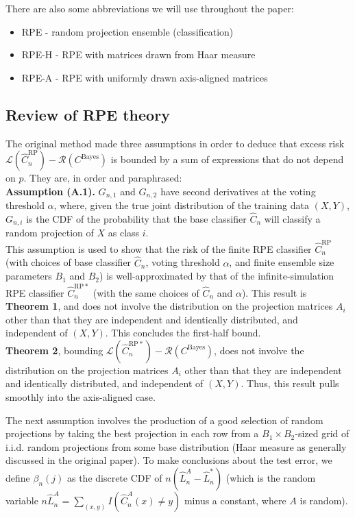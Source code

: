 \documentclass[ejs,preprint]{imsart}
\newcommand\cbayes{C^{\mathrm{Bayes}}}
\newcommand\crpnhat{\hat{C}_{n}^{\mathrm{RP}}}
\newcommand\crpnhatstar{\hat{C}_{n}^{\mathrm{RP*}}}
\newcommand\risk{\mathcal{L}}
\newcommand\rrisk{\mathcal{R}}
\begin{document}
There are also some abbreviations we will use throughout the paper:
\begin{itemize}
\item RPE - random projection ensemble (classification)
\item RPE-H - RPE with matrices drawn from Haar measure
\item RPE-A - RPE with uniformly drawn axis-aligned matrices
\end{itemize}

\subsection{Review of RPE theory}\label{sec:review}

The original method made three assumptions in order to deduce that
excess risk $\risk(\crpnhat)-\rrisk(\cbayes)$ is bounded by a sum
of expressions that do not depend on $p$. They are, in order and
paraphrased:\\


\noindent \textbf{Assumption (A.1).} $G_{n,1}$ and $G_{n,2}$ have
second derivatives at the voting threshold $\alpha$, where, given
the true joint distribution of the training data $(X,Y)$, $G_{n,i}$
is the CDF of the probability that the base classifier $\hat{C}_{n}$
will classify a random projection of $X$ as class $i$.\\


This assumption is used to show that the risk of the finite
RPE classifier $\crpnhat$ (with choices of base classifier $\hat{C}_{n}$,
voting threshold $\alpha$, and finite ensemble size parameters $B_{1}$
and $B_{2}$) is well-approximated by that of the infinite-simulation
RPE classifier $\crpnhatstar$ (with the same choices of $\hat{C}_{n}$
and $\alpha$). This result is \textbf{Theorem 1}, and does not involve
the distribution on the projection matrices $A_{i}$ other than that
they are independent and identically distributed, and independent
of $(X,Y)$. This concludes the first-half bound.\\


\textbf{Theorem 2}, bounding $\risk(\crpnhatstar)-\rrisk(\cbayes)$,
does not involve the distribution on the projection matrices $A_{i}$
other than that they are independent and identically distributed,
and independent of $(X,Y)$. Thus, this result pulls smoothly into
the axis-aligned case.


The next assumption involves the production of a good selection of random projections by taking the best projection in each row from a $B_{1}\times B_{2}$-sized grid of i.i.d. random projections from some base distribution (Haar measure as generally discussed in the original paper). To make conclusions about the test error, we define $\beta_{n}(j)$ as the discrete CDF of $n\left(\hat{L}_{n}^{A}-\hat{L}_{n}^{*}\right)$ (which is the random variable $n\hat{L}_{n}^{A}=\sum_{(x,y)}I(\hat{C}_{n}^{A}(x)\neq y)$ minus a constant, where $A$ is random).\\
\end{document}
